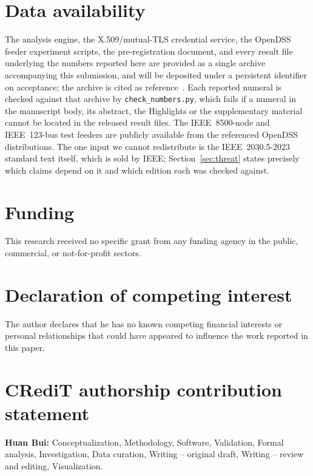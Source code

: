 \documentclass[review]{elsarticle}
\begin{document}










\section*{Data availability}
The analysis engine, the X.509/mutual-TLS credential service, the OpenDSS feeder experiment
scripts, the pre-registration document, and every result file underlying the numbers reported here
are provided as a single archive accompanying this submission, and will be deposited under a
persistent identifier on acceptance; the archive is cited as
reference~\cite{dataset_containder}. Each reported numeral is checked against that archive by
\texttt{check\_numbers.py}, which fails if a numeral in the manuscript body, its abstract, the
Highlights or the supplementary material cannot be located in the released result files. The IEEE~8500-node and IEEE~123-bus test feeders are publicly
available from the referenced OpenDSS distributions. The one input we cannot redistribute is the
IEEE~2030.5-2023 standard text itself, which is sold by IEEE; Section~\ref{sec:threat} states
precisely which claims depend on it and which edition each was checked against.

\section*{Funding}
This research received no specific grant from any funding agency in the public, commercial, or
not-for-profit sectors.

\section*{Declaration of competing interest}
The author declares that he has no known competing financial interests or personal relationships
that could have appeared to influence the work reported in this paper.

\section*{CRediT authorship contribution statement}
\textbf{Huan Bui:} Conceptualization, Methodology, Software, Validation, Formal analysis,
Investigation, Data curation, Writing -- original draft, Writing -- review and editing,
Visualization.
\end{document}
